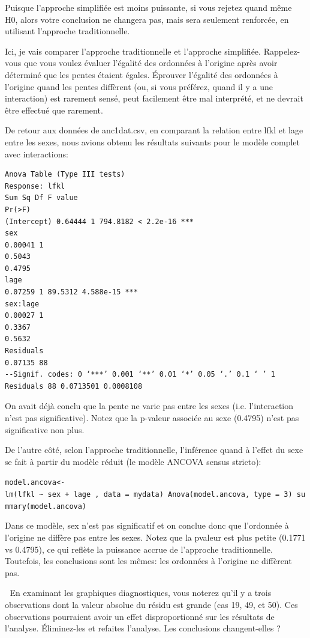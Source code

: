 \documentclass[12pt,]{book}
\begin{document}
Puisque l'approche simplifiée est moins puissante, si vous rejetez
quand même H0, alors votre conclusion ne changera pas, mais sera
seulement renforcée, en utilisant l'approche traditionnelle.

Ici, je vais comparer l'approche traditionnelle et l'approche simplifiée.
Rappelez-vous que vous voulez évaluer l'égalité des ordonnées à
l'origine après avoir déterminé que les pentes étaient égales.
Éprouver l'égalité des ordonnées à l'origine quand les pentes diffèrent
(ou, si vous préférez, quand il y a une interaction) est rarement sensé,
peut facilement être mal interprété, et ne devrait être effectué que
rarement.

De retour aux données de anc1dat.csv, en comparant la relation
entre lfkl et lage entre les sexes, nous avions obtenu les résultats
suivants pour le modèle complet avec interactions:

\begin{verbatim}
Anova Table (Type III tests)
Response: lfkl
Sum Sq Df F value
Pr(>F)
(Intercept) 0.64444 1 794.8182 < 2.2e-16 ***
sex
0.00041 1
0.5043
0.4795
lage
0.07259 1 89.5312 4.588e-15 ***
sex:lage
0.00027 1
0.3367
0.5632
Residuals
0.07135 88
--Signif. codes: 0 ‘***’ 0.001 ‘**’ 0.01 ‘*’ 0.05 ‘.’ 0.1 ‘ ’ 1
Residuals 88 0.0713501 0.0008108
\end{verbatim}

On avait déjà conclu que la pente ne varie pas entre les sexes (i.e.
l'interaction n'est pas significative). Notez que la p-valeur associée au
sexe (0.4795) n'est pas significative non plus.

De l'autre côté, selon l'approche traditionnelle, l'inférence quand à
l'effet du sexe se fait à partir du modèle réduit (le modèle ANCOVA
sensus stricto):

\texttt{model.ancova\textless{}-lm(lfkl\ \textasciitilde{}\ sex\ +\ lage\ ,\ data\ =\ mydata)\ Anova(model.ancova,\ type\ =\ 3)\ summary(model.ancova)}

Dans ce modèle, sex n'est pas significatif et on conclue donc que
l'ordonnée à l'origine ne diffère pas entre les sexes. Notez que la pvaleur est plus petite (0.1771 vs 0.4795), ce qui reflète la puissance
accrue de l'approche traditionnelle. Toutefois, les conclusions sont les
mêmes: les ordonnées à l'origine ne diffèrent pas.

 En examinant les graphiques diagnostiques, vous noterez qu'il y a trois
observations dont la valeur absolue du résidu est grande (cas 19, 49, et
50). Ces observations pourraient avoir un effet disproportionné sur
les résultats de l'analyse. Éliminez-les et refaites l'analyse. Les conclusions changent-elles ?
\end{document}
